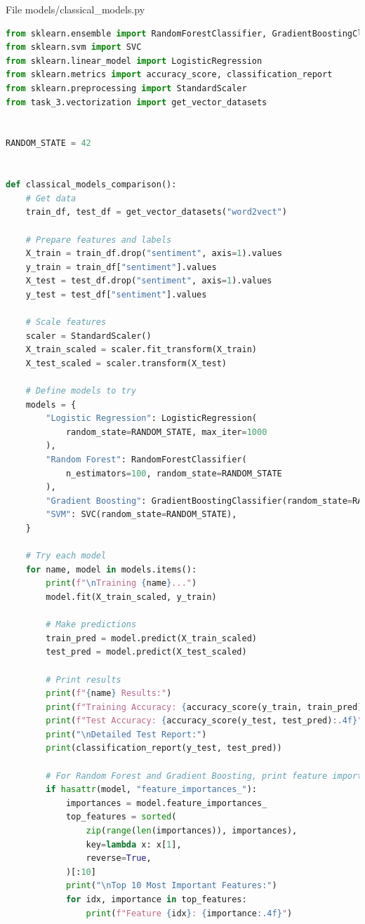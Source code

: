 \documentclass[12pt]{article}
\begin{document}
File models/classical\_models.py
\begin{lstlisting}[language=Python]
from sklearn.ensemble import RandomForestClassifier, GradientBoostingClassifier
from sklearn.svm import SVC
from sklearn.linear_model import LogisticRegression
from sklearn.metrics import accuracy_score, classification_report
from sklearn.preprocessing import StandardScaler
from task_3.vectorization import get_vector_datasets


RANDOM_STATE = 42


def classical_models_comparison():
    # Get data
    train_df, test_df = get_vector_datasets("word2vect")

    # Prepare features and labels
    X_train = train_df.drop("sentiment", axis=1).values
    y_train = train_df["sentiment"].values
    X_test = test_df.drop("sentiment", axis=1).values
    y_test = test_df["sentiment"].values

    # Scale features
    scaler = StandardScaler()
    X_train_scaled = scaler.fit_transform(X_train)
    X_test_scaled = scaler.transform(X_test)

    # Define models to try
    models = {
        "Logistic Regression": LogisticRegression(
            random_state=RANDOM_STATE, max_iter=1000
        ),
        "Random Forest": RandomForestClassifier(
            n_estimators=100, random_state=RANDOM_STATE
        ),
        "Gradient Boosting": GradientBoostingClassifier(random_state=RANDOM_STATE),
        "SVM": SVC(random_state=RANDOM_STATE),
    }

    # Try each model
    for name, model in models.items():
        print(f"\nTraining {name}...")
        model.fit(X_train_scaled, y_train)

        # Make predictions
        train_pred = model.predict(X_train_scaled)
        test_pred = model.predict(X_test_scaled)

        # Print results
        print(f"{name} Results:")
        print(f"Training Accuracy: {accuracy_score(y_train, train_pred):.4f}")
        print(f"Test Accuracy: {accuracy_score(y_test, test_pred):.4f}")
        print("\nDetailed Test Report:")
        print(classification_report(y_test, test_pred))

        # For Random Forest and Gradient Boosting, print feature importance
        if hasattr(model, "feature_importances_"):
            importances = model.feature_importances_
            top_features = sorted(
                zip(range(len(importances)), importances),
                key=lambda x: x[1],
                reverse=True,
            )[:10]
            print("\nTop 10 Most Important Features:")
            for idx, importance in top_features:
                print(f"Feature {idx}: {importance:.4f}")
\end{lstlisting}
\end{document}
